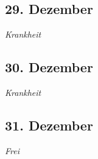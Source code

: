 \subsection{29. Dezember}
\textit{Krankheit}
\subsection{30. Dezember}
\textit{Krankheit}
\subsection{31. Dezember}
\textit{Frei}